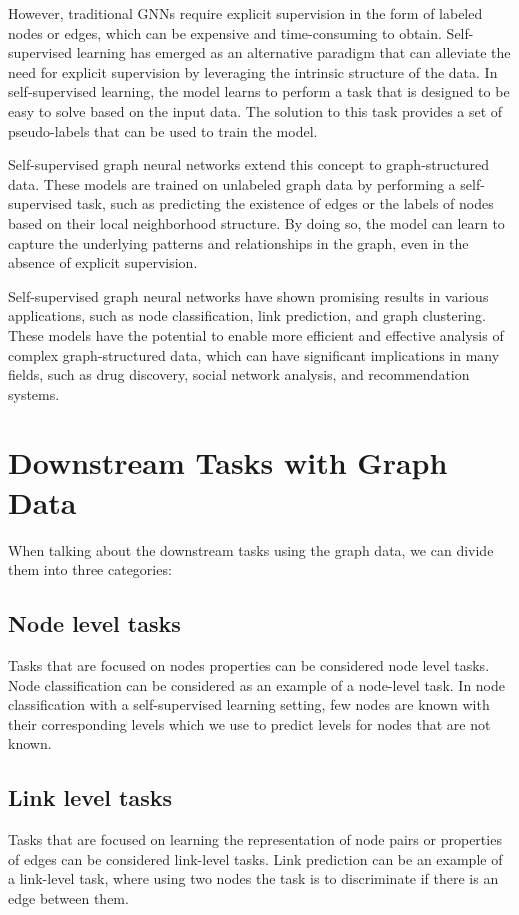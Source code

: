 \documentclass[a4paper,11pt]{report}
\begin{document}
However, traditional GNNs require explicit supervision in the form of labeled nodes or edges, which can be expensive and time-consuming to obtain. Self-supervised learning has emerged as an alternative paradigm that can alleviate the need for explicit supervision by leveraging the intrinsic structure of the data. In self-supervised learning, the model learns to perform a task that is designed to be easy to solve based on the input data. The solution to this task provides a set of pseudo-labels that can be used to train the model.

Self-supervised graph neural networks extend this concept to graph-structured data. These models are trained on unlabeled graph data by performing a self-supervised task, such as predicting the existence of edges or the labels of nodes based on their local neighborhood structure. By doing so, the model can learn to capture the underlying patterns and relationships in the graph, even in the absence of explicit supervision.

Self-supervised graph neural networks have shown promising results in various applications, such as node classification, link prediction, and graph clustering. These models have the potential to enable more efficient and effective analysis of complex graph-structured data, which can have significant implications in many fields, such as drug discovery, social network analysis, and recommendation systems.
  

  
\chapter{Downstream Tasks with Graph Data }

When talking about the downstream tasks using the graph data, we can divide them into three categories:  

\section{Node level tasks}
Tasks that are focused on nodes properties can be considered node level tasks. Node classification can be considered as an example of a node-level task. In node classification with a self-supervised learning setting, few nodes are known with their corresponding levels which we use to predict levels for nodes that are not known.
\section{Link level tasks}
Tasks that are focused on learning the representation of node pairs or properties of edges can be considered link-level tasks. Link prediction can be an example of a link-level task, where using two nodes the task is to discriminate if there is an edge between them.
\end{document}
